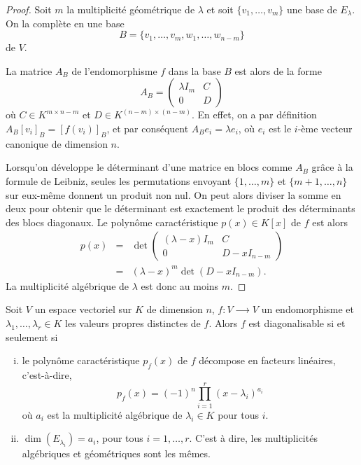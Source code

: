   \begin{proof}
    Soit $m$ la multiplicité géométrique de $λ$ et soit  $\{v_1,\dots,v_m\}$  une base de $E_{λ}$. On la complète en une base
    \begin{displaymath}
B =     \{ v_1,\dots,v_m, w_1,\dots,w_{n-m}\} 
    \end{displaymath}
    de $V$.

    La matrice $A_B$ de l'endomorphisme $f$ dans la base $B$ est alors de la forme
    \begin{displaymath}
      A_B =
      \begin{pmatrix}
        λ I_m & C \\
        0 & D
      \end{pmatrix}
    \end{displaymath}
    où $C ∈ K^{m × n-m}$ et $D ∈ K^{(n-m) ×(n-m)}$. En effet, on a par définition $A_B[v_i]_{B} = [f(v_i)]_{B}$, et par conséquent $A_B e_i = \lambda e_i$, où $e_i$ est le $i$-ème vecteur canonique de dimension $n$.
    
    Lorsqu'on développe le déterminant d'une matrice en blocs comme $A_B$ grâce à la formule de Leibniz, seules les permutations envoyant $\{1, \dots, m\}$ et $\{m+1, \dots, n\}$ sur eux-même donnent un produit non nul. On peut alors diviser la somme en deux pour obtenir que le déterminant est exactement le produit des déterminants des blocs diagonaux.
    Le polynôme caractéristique $p(x) ∈ K[x]$ de $f$ est alors
    \begin{eqnarray*} p(x) & = &  
      \det   \begin{pmatrix}
        (λ -x) I_m & C \\
        0 & D-xI_{n-m}
      \end{pmatrix} \\
          & = & (λ -x)^m \det \left(D-xI_{n-m}\right). 
    \end{eqnarray*}
    La multiplicité algébrique de $λ$ est donc au moins $m$. 
  \end{proof}



\begin{theorem}
  \label{thr:45}
  Soit $V$ un espace vectoriel sur $K$ de dimension $n$, $f:V⟶V$  un endomorphisme et $λ_1,\dots,λ_r ∈ K$ les valeurs propres distinctes de $f$.    Alors $f$ est diagonalisable si et seulement si 
  \begin{enumerate}[i)]
  \item le polynôme caractéristique $p_f(x)$ de $f$ décompose en facteurs linéaires, c'est-à-dire, \label{item:19} 
    \begin{displaymath}
      p_f(x) = (-1)^n ∏_{i=1}^r (x - λ_i )^{a_i}
    \end{displaymath}
    où $a_i$ est la multiplicité algébrique de $λ_i∈K$ pour tous $i$. 
    \item  $\dim(E_{λ_i}) = a_i$, pour tous $i=1,\dots,r$. C'est à dire, les multiplicités algébriques et géométriques sont les mêmes. \label{item:20}
  \end{enumerate}
\end{theorem}

